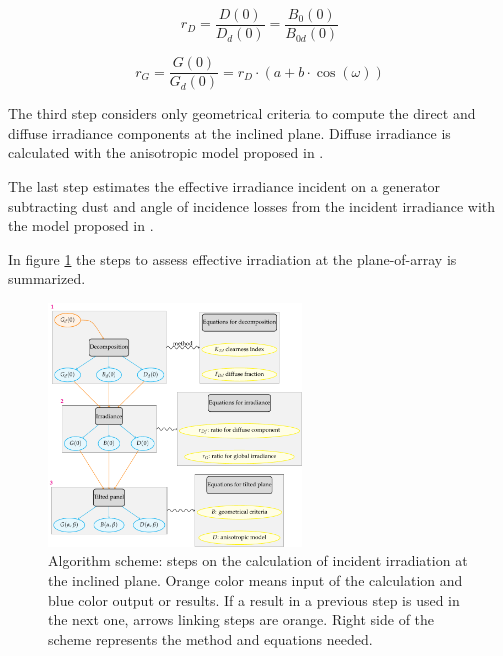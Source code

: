 \begin{equation}\label{ratioB0}
r_{D}=\frac{D(0)}{D_d(0)}=\frac{B_0(0)}{B_{0d}(0)}
\end{equation}


\begin{equation}\label{ratioG0}
r_G=\frac{G(0)}{G_d(0)}=r_D\cdot(a+b\cdot\cos(\omega))
\end{equation}


The third step considers only geometrical criteria to compute the direct and diffuse irradiance components at the inclined plane. Diffuse irradiance is calculated with the anisotropic model proposed in \cite{hay1985estimating}.

The last step estimates the effective irradiance incident on a generator subtracting dust and angle of incidence losses from the incident irradiance with the model proposed in \cite{Martin2001}.

In figure \ref{fig:algorithm_outline} the steps to assess effective irradiation at the plane-of-array is summarized.

\begin{figure}
  \centering
  \includegraphics[width=0.6\textwidth]{figs/algorithm_outline}
  \caption{Algorithm scheme: steps on the calculation of incident irradiation at the inclined plane. Orange color means input of the calculation and blue color output or results. If a result in a previous step is used in the next one, arrows linking steps are orange. Right side of the scheme represents the method and equations needed.}
 \label{fig:algorithm_outline}
\end{figure}

